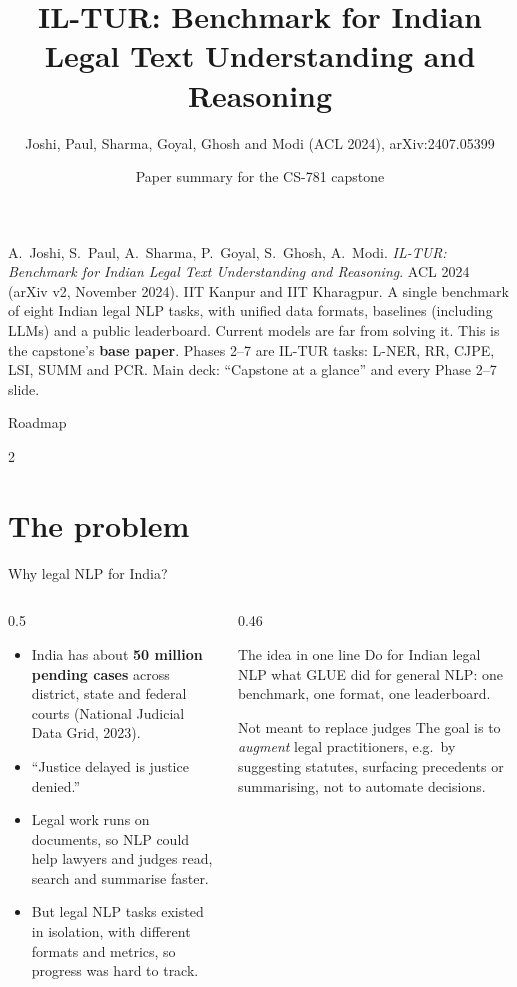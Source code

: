 \documentclass[aspectratio=169,11pt]{beamer}
\title[IL-TUR]{IL-TUR: Benchmark for Indian Legal Text Understanding and Reasoning}
\subtitle{Joshi, Paul, Sharma, Goyal, Ghosh and Modi (ACL 2024), arXiv:2407.05399}
\author[Paper summary]{Paper summary for the CS-781 capstone}
\date{}
\begin{document}
\begin{frame}\titlepage\end{frame}

\paperglance
{A.\ Joshi, S.\ Paul, A.\ Sharma, P.\ Goyal, S.\ Ghosh, A.\ Modi. \emph{IL-TUR: Benchmark for Indian Legal Text Understanding and Reasoning}. ACL 2024 (arXiv v2, November 2024). IIT Kanpur and IIT Kharagpur.}
{A single benchmark of eight Indian legal NLP tasks, with unified data formats, baselines (including LLMs) and a public leaderboard. Current models are far from solving it.}
{This is the capstone's \textbf{base paper}. Phases 2--7 are IL-TUR tasks: L-NER, RR, CJPE, LSI, SUMM and PCR.}
{Main deck: ``Capstone at a glance'' and every Phase 2--7 slide.}

\begin{frame}{Roadmap}
  \begin{multicols}{2}\small\tableofcontents\end{multicols}
\end{frame}

\section{The problem}

\begin{frame}{Why legal NLP for India?}
  \begin{columns}[T]
    \begin{column}{0.5\textwidth}
      \small
      \begin{itemize}
        \item India has about \textbf{50 million pending cases} across district, state and federal courts (National Judicial Data Grid, 2023).
        \item ``Justice delayed is justice denied.''
        \item Legal work runs on documents, so NLP could help lawyers and judges read, search and summarise faster.
        \item But legal NLP tasks existed in isolation, with different formats and metrics, so progress was hard to track.
      \end{itemize}
    \end{column}
    \begin{column}{0.46\textwidth}
      \begin{exampleblock}{The idea in one line}
        \small
        Do for Indian legal NLP what GLUE did for general NLP: one benchmark, one format, one leaderboard.
      \end{exampleblock}
      \begin{alertblock}{Not meant to replace judges}
        \small
        The goal is to \emph{augment} legal practitioners, e.g.\ by suggesting statutes, surfacing precedents or summarising, not to automate decisions.
      \end{alertblock}
    \end{column}
  \end{columns}
\end{frame}
\end{document}
